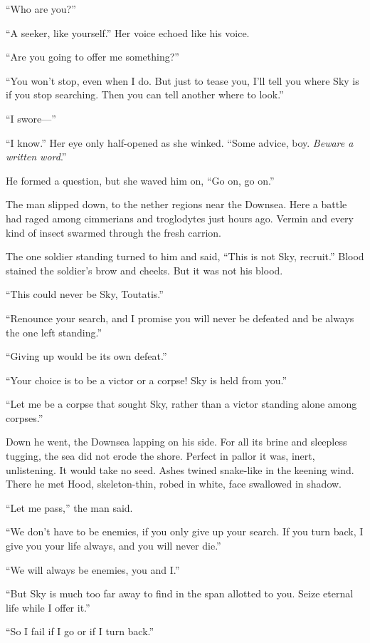 ``Who are you?''

``A seeker, like yourself.'' Her voice echoed like his voice.

``Are you going to offer me something?''

``You won't stop, even when I do. But just to tease you, I'll tell you
where Sky is if you stop searching. Then you can tell another where to
look.''

``I swore---''

``I know.'' Her eye only half-opened as she winked. ``Some advice, boy.
\emph{Beware a written word}.''

He formed a question, but she waved him on, ``Go on, go on.''

The man slipped down, to the nether regions near the Downsea. Here a
battle had raged among cimmerians and troglodytes just hours ago. Vermin
and every kind of insect swarmed through the fresh carrion.

The one soldier standing turned to him and said, ``This is not Sky,
recruit.'' Blood stained the soldier's brow and cheeks. But it was not
his blood.

``This could never be Sky, Toutatis.''

``Renounce your search, and I promise you will never be defeated and be
always the one left standing.''

``Giving up would be its own defeat.''

``Your choice is to be a victor or a corpse! Sky is held from you.''

``Let me be a corpse that sought Sky, rather than a victor standing
alone among corpses.''

Down he went, the Downsea lapping on his side. For all its brine and
sleepless tugging, the sea did not erode the shore. Perfect in pallor it
was, inert, unlistening. It would take no seed. Ashes twined snake-like
in the keening wind. There he met Hood, skeleton-thin, robed in white,
face swallowed in shadow.

``Let me pass,'' the man said.

``We don't have to be enemies, if you only give up your search. If you
turn back, I give you your life always, and you will never die.''

``We will always be enemies, you and I.''

``But Sky is much too far away to find in the span allotted to you.
Seize eternal life while I offer it.''

``So I fail if I go or if I turn back.''

